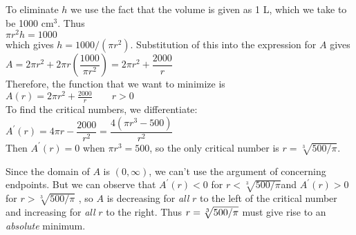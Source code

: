 \documentclass{sebase}
\begin{document}
\begin{Solution}
To eliminate $h$ we use the fact that the volume is given as 1 L, which we
take to be 1000 $\mathrm{cm}^{3}$. Thus\\[6pt]
\hspace*{\fill}$\pi r^{2}h=1000$\hspace*{\fill}\\[9pt]
which gives $h=1000/(\pi r^{2})$. Substitution of this into the expression
for $A$ gives\\[6pt]
\hspace*{\fill}$A=2\pi r^{2}+2\pi r\left( \dfrac{1000}{\pi r^{2}}\right)
=2\pi r^{2}+\dfrac{2000}{r}$\hspace*{\fill}\\[9pt]
Therefore, the function that we want to minimize is \\[6pt]
\hspace*{\fill}$A(r)=2\pi r^{2}+\frac{2000}{r}\qquad r>0$\hspace*{\fill}%
\pagebreak \\[6pt]
To find the critical
numbers, we differentiate:\\[6pt]
\hspace*{\fill}$A^{\prime }(r)=4\pi r-\dfrac{2000}{r^{2}}=\dfrac{4(\pi
r^{3}-500)}{r^{2}}$\hspace*{\fill}\\[6pt]
Then $A^{\prime }(r)=0$ when $\pi r^{3}=500$, so the only critical number is 
$r=\sqrt[3]{500/\pi }$.

Since the domain of $A$ is $(0,\infty )$, we can't use the argument of 
concerning endpoints. But we can observe that $A^{\prime }(r)<0$ for $r<\sqrt%
[3]{500/\pi }${}\thinspace and $A^{\prime }(r)>0$ for $r>\sqrt[3]{500/\pi }$%
, so $A$ is decreasing for \textit{all} $r$ to the left of the critical
number and increasing for \textit{all} $r$ to the right. Thus $r=\sqrt[3]{%
500/\pi }$ must give rise to an \textit{absolute} minimum.


\end{Solution}
\end{document}
